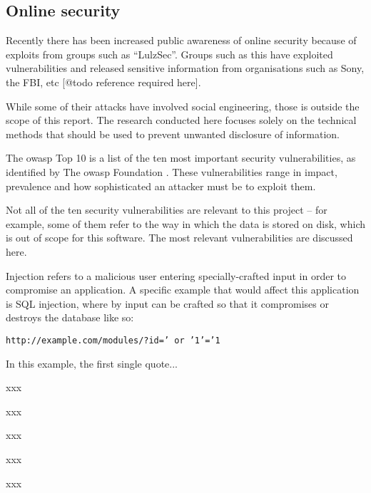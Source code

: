
\subsection{Online security}
\label{sec:research_security}

Recently there has been increased public awareness of online security because
of exploits from groups such as ``LulzSec''. Groups such as this have
exploited vulnerabilities and released sensitive information from
organisations such as Sony, the FBI, etc [@todo reference required here].

While some of their attacks have involved social engineering, those is outside
the scope of this report. The research conducted here focuses solely on the
technical methods that should be used to prevent unwanted disclosure of
information.

The \gls{owasp} Top 10 is a list of the ten most important security
vulnerabilities, as identified by The \gls{owasp} Foundation
\cite{OWASPTop10_2010}. These vulnerabilities range in impact, prevalence and
how sophisticated an attacker must be to exploit them.

Not all of the ten security vulnerabilities are relevant to this project --
for example, some of them refer to the way in which the data is stored on
disk, which is out of scope for this software. The most relevant
vulnerabilities are discussed here.


Injection refers to a malicious user entering specially-crafted input in order
to compromise an application. A specific example that would affect this
application is SQL injection, where by input can be crafted so that it
compromises or destroys the database like so:

\texttt{http://example.com/modules/?id=' or '1'='1}

In this example, the first single quote...


xxx


xxx


xxx


xxx


xxx

